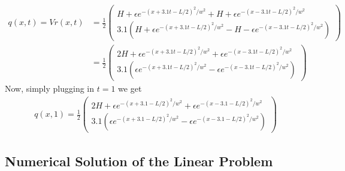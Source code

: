 \begin{align*}
q(x,t) = Vr(x,t) &= \frac{1}{2} \begin{pmatrix}
H + \epsilon e^{-(x+3.1t-L/2)^2/w^2} +H + \epsilon e^{-(x-3.1t-L/2)^2/w^2} \\
3.1(H + \epsilon e^{-(x+3.1t-L/2)^2/w^2} -H - \epsilon e^{-(x-3.1t-L/2)^2/w^2})
\end{pmatrix} \\
&= \frac{1}{2}\begin{pmatrix}
 2H + \epsilon e^{-(x+3.1t-L/2)^2/w^2} + \epsilon e^{-(x-3.1t-L/2)^2/w^2} \\
3.1( \epsilon e^{-(x+3.1t-L/2)^2/w^2} - \epsilon e^{-(x-3.1t-L/2)^2/w^2})
\end{pmatrix}
\end{align*} 
Now, simply plugging in $t=1$ we get
\begin{align*}
q(x,1) = \frac{1}{2}\begin{pmatrix}
 2H + \epsilon e^{-(x+3.1-L/2)^2/w^2} + \epsilon e^{-(x-3.1-L/2)^2/w^2} \\
3.1( \epsilon e^{-(x+3.1-L/2)^2/w^2} - \epsilon e^{-(x-3.1-L/2)^2/w^2})
\end{pmatrix}
\end{align*}

\subsection{Numerical Solution of the Linear Problem}